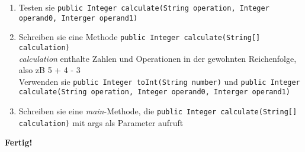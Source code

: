 \documentclass[a4paper]{article}
\begin{document}
\begin{enumerate}
\item Testen sie \texttt{public Integer calculate(String operation, Integer operand0, Interger operand1)}

\item Schreiben sie eine Methode \texttt{public Integer calculate(String[] calculation)}\\
\textit{calculation} enthalte Zahlen und Operationen in der gewohnten Reichenfolge, also zB 5 + 4 - 3\\
Verwenden sie \texttt{public Integer toInt(String number)} und \texttt{public Integer calculate(String operation, Integer operand0, Interger operand1)}

\item Schreiben sie eine \textit{main}-Methode, die \texttt{public Integer calculate(String[] calculation)} mit args als Parameter aufruft

\end{enumerate}

\begin{center}
\textbf{\large Fertig!}
\end{center}
\end{document}
